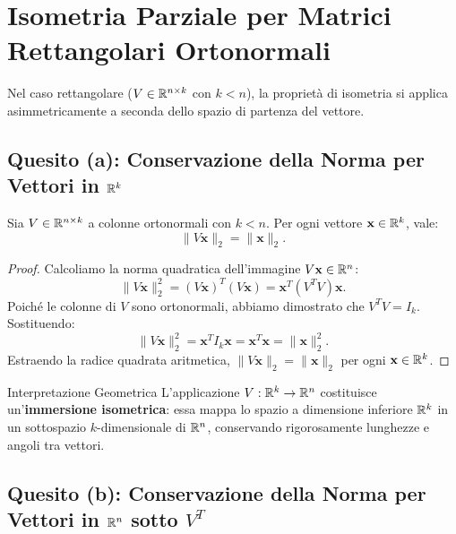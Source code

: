 \FloatBarrier
\section{Isometria Parziale per Matrici Rettangolari Ortonormali}

Nel caso rettangolare ($V \in \mathbb{R}^{n \times k}$ con $k < n$), la propriet\`a di isometria si applica asimmetricamente a seconda dello spazio di partenza del vettore.

\subsection{Quesito (a): Conservazione della Norma per Vettori in \texorpdfstring{$\mathbb{R}^k$}{R\textasciicircum k}}

\begin{proposition}
\label{prop:isometria-destra}
Sia $V \in \mathbb{R}^{n \times k}$ a colonne ortonormali con $k < n$. Per ogni vettore $\mathbf{x} \in \mathbb{R}^k$, vale:
\begin{equation}
    \|V\mathbf{x}\|_2 = \|\mathbf{x}\|_2.
\end{equation}
\end{proposition}

\begin{proof}
Calcoliamo la norma quadratica dell'immagine $V\mathbf{x} \in \mathbb{R}^n$:
\begin{equation}
    \|V\mathbf{x}\|_2^2 = (V\mathbf{x})^T (V\mathbf{x}) = \mathbf{x}^T (V^T V) \mathbf{x}.
\end{equation}
Poich\'e le colonne di $V$ sono ortonormali, abbiamo dimostrato che $V^T V = I_k$. Sostituendo:
\begin{equation}
    \|V\mathbf{x}\|_2^2 = \mathbf{x}^T I_k \mathbf{x} = \mathbf{x}^T \mathbf{x} = \|\mathbf{x}\|_2^2.
\end{equation}
Estraendo la radice quadrata aritmetica, $\|V\mathbf{x}\|_2 = \|\mathbf{x}\|_2$ per ogni $\mathbf{x} \in \mathbb{R}^k$.
\end{proof}

\begin{noteblock}{Interpretazione Geometrica}
L'applicazione $V: \mathbb{R}^k \to \mathbb{R}^n$ costituisce un'\textbf{immersione isometrica}: essa mappa lo spazio a dimensione inferiore $\mathbb{R}^k$ in un sottospazio $k$-dimensionale di $\mathbb{R}^n$, conservando rigorosamente lunghezze e angoli tra vettori.
\end{noteblock}

\subsection{Quesito (b): Conservazione della Norma per Vettori in \texorpdfstring{$\mathbb{R}^n$}{R\textasciicircum n} sotto \texorpdfstring{$V^T$}{V\textasciicircum T}}

